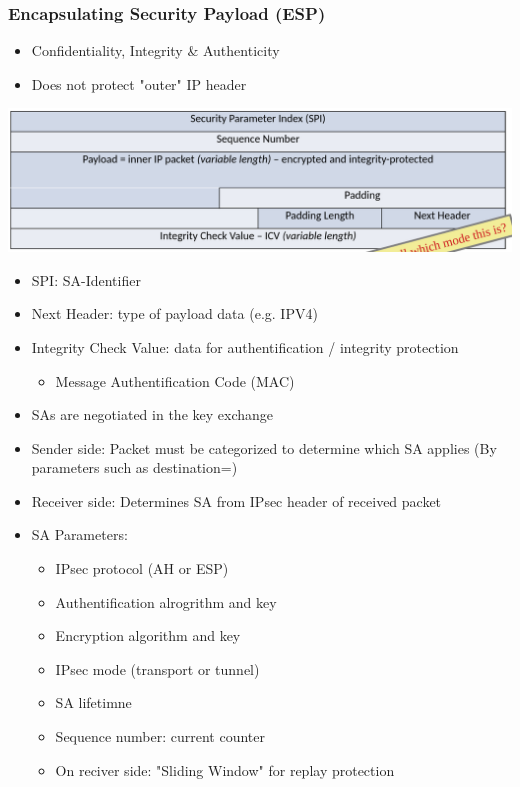 \subsubsection{Encapsulating Security Payload (ESP)}
\begin{itemize}
  \item Confidentiality, Integrity \& Authenticity
  \item Does not protect "outer" IP header
\end{itemize}
\includegraphics[width=\columnwidth]{Resources/esp.png}
\begin{itemize}
  \item SPI: SA-Identifier
  \item Next Header: type of payload data (e.g. IPV4)
  \item Integrity Check Value: data for authentification / integrity protection
    \begin{itemize}
      \item Message Authentification Code (MAC)
    \end{itemize}
  \item SAs are negotiated in the key exchange
  \item Sender side: Packet must be categorized to determine which SA applies (By parameters such as destination=)
  \item Receiver side: Determines SA from IPsec header of received packet
  \item SA Parameters:
    \begin{itemize}
      \item IPsec protocol (AH or ESP)
      \item Authentification alrogrithm and key
      \item Encryption algorithm and key
      \item IPsec mode (transport or tunnel)
      \item SA lifetimne
      \item Sequence number: current counter
      \item On reciver side: "Sliding Window" for replay protection
    \end{itemize}
\end{itemize}

